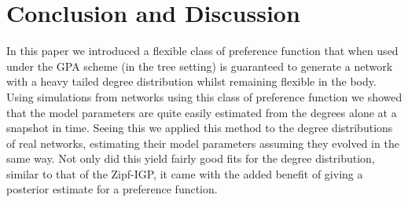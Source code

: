 \documentclass[
  sn-basic,
]{sn-jnl}
\theoremstyle{plain}
\theoremstyle{remark}
\begin{document}
\begin{figure}[H]


\caption{\label{fig-rec2}}

\end{figure}%

\section{Conclusion and Discussion}\label{sec-conc}

In this paper we introduced a flexible class of preference function that
when used under the GPA scheme (in the tree setting) is guaranteed to
generate a network with a heavy tailed degree distribution whilst
remaining flexible in the body. Using simulations from networks using
this class of preference function we showed that the model parameters
are quite easily estimated from the degrees alone at a snapshot in time.
Seeing this we applied this method to the degree distributions of real
networks, estimating their model parameters assuming they evolved in the
same way. Not only did this yield fairly good fits for the degree
distribution, similar to that of the Zipf-IGP, it came with the added
benefit of giving a posterior estimate for a preference function.
\end{document}

